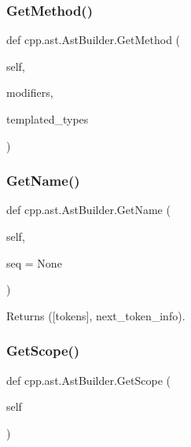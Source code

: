 \subsubsection{\texorpdfstring{GetMethod()}{GetMethod()}}
{\footnotesize\ttfamily def cpp.\+ast.\+Ast\+Builder.\+Get\+Method (\begin{DoxyParamCaption}\item[{}]{self,  }\item[{}]{modifiers,  }\item[{}]{templated\+\_\+types }\end{DoxyParamCaption})}

\mbox{\label{classcpp_1_1ast_1_1AstBuilder_a327957c4228325fc5f64821b047bdc6f}} 
\subsubsection{\texorpdfstring{GetName()}{GetName()}}
{\footnotesize\ttfamily def cpp.\+ast.\+Ast\+Builder.\+Get\+Name (\begin{DoxyParamCaption}\item[{}]{self,  }\item[{}]{seq = {\ttfamily None} }\end{DoxyParamCaption})}

\begin{DoxyVerb}Returns ([tokens], next_token_info).\end{DoxyVerb}
 \mbox{\label{classcpp_1_1ast_1_1AstBuilder_add6826421ce64546a7dbb9b2e699a4d4}} 
\subsubsection{\texorpdfstring{GetScope()}{GetScope()}}
{\footnotesize\ttfamily def cpp.\+ast.\+Ast\+Builder.\+Get\+Scope (\begin{DoxyParamCaption}\item[{}]{self }\end{DoxyParamCaption})}

\mbox{\label{classcpp_1_1ast_1_1AstBuilder_acf6ec42d567cd85a9bad77772c381a4e}} 
